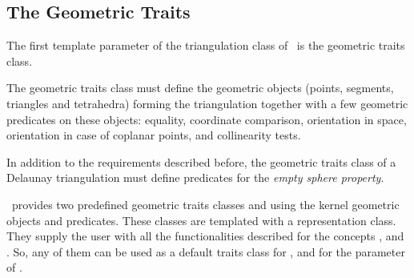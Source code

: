 


\subsection{The Geometric Traits}
\label{Triangulation3-sec-Traits}

The first template parameter of the triangulation class
 of \cgal\ is the geometric traits class.

The geometric traits class must define the geometric
objects (points, segments, triangles and tetrahedra) forming the
triangulation together with a few geometric predicates on these objects:
equality, coordinate comparison, orientation in space, orientation
in case of coplanar points, and collinearity tests.

In addition to the requirements described before, the geometric traits
class of a Delaunay triangulation must define predicates for the
\textit{empty sphere property}.

\cgal\ provides two predefined geometric traits classes
 and  using the kernel
geometric objects and predicates.
These classes are templated with a representation class.
They supply the user with all
the functionalities described for the concepts
,
and
.
So, any of them can be used as a default traits
class for ,
and for the parameter  of .

